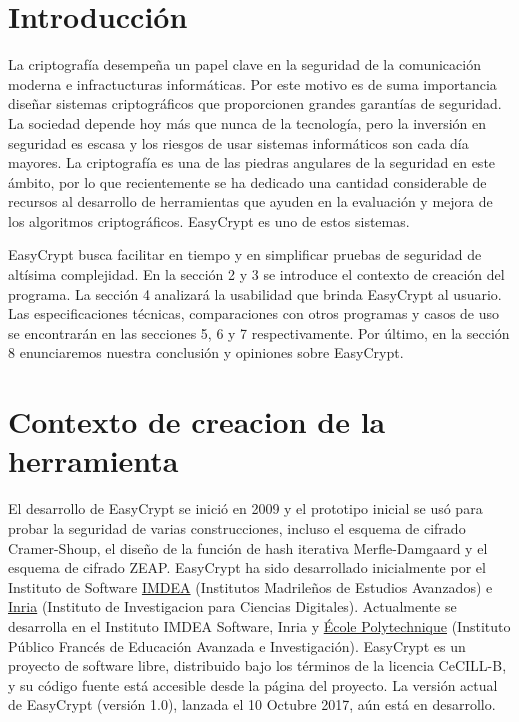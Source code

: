 \documentclass[runningheads,a4paper]{llncs}
\begin{document}
\section{Introducción}
La criptografía desempeña un papel clave en la seguridad de la comunicación moderna e infractucturas informáticas.  Por este motivo es de suma importancia diseñar sistemas criptográficos que proporcionen grandes garantías de seguridad.
La sociedad depende hoy más que nunca de la tecnología, pero la inversión en seguridad es escasa y los riesgos de usar sistemas informáticos son cada día mayores. La criptografía es una de las piedras angulares de la seguridad en este  ámbito, por lo que recientemente se ha dedicado una cantidad considerable de recursos al desarrollo de herramientas que ayuden en la evaluación y mejora de los algoritmos criptográficos. EasyCrypt es uno de estos sistemas.

EasyCrypt busca facilitar en tiempo y en simplificar pruebas de seguridad de altísima complejidad. En la sección 2 y 3 se introduce el contexto de creación del programa. La sección 4 analizará la usabilidad que brinda EasyCrypt al usuario. Las especificaciones técnicas, comparaciones con otros programas y casos de uso se encontrarán en las secciones 5, 6 y 7 respectivamente. Por último, en la sección 8 enunciaremos nuestra conclusión y opiniones sobre EasyCrypt.
    
\section{Contexto de creacion de la herramienta}
El desarrollo de EasyCrypt se inició en 2009 y el prototipo inicial se usó para probar la seguridad de varias construcciones, incluso el esquema de cifrado Cramer-Shoup, el diseño de la función de hash iterativa Merfle-Damgaard y el esquema de cifrado ZEAP. EasyCrypt ha sido desarrollado inicialmente por el Instituto de Software \href{http://www.imdea.org/es}{IMDEA} (Institutos Madrileños de Estudios Avanzados) e \href{https://www.inria.fr/en/}{Inria} (Instituto de Investigacion para Ciencias Digitales). Actualmente se desarrolla en el Instituto IMDEA Software, Inria y \href{https://www.polytechnique.edu/}{École Polytechnique} (Instituto Público Francés de Educación Avanzada e Investigación). EasyCrypt es un proyecto de software libre, distribuido bajo los términos de la licencia CeCILL-B, y su código fuente está accesible desde la página del proyecto. 
La versión actual de EasyCrypt (versión 1.0), lanzada el 10 Octubre 2017, aún está en desarrollo. 
\cite{article2}
\end{document}
